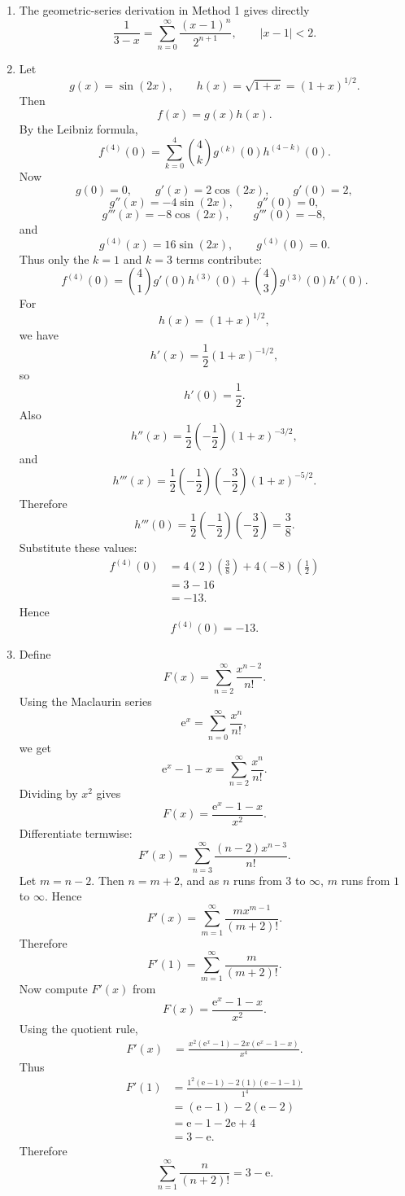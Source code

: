 \documentclass[12pt]{article}
\newcommand{\ee}{\mathrm{e}}
\begin{document}
\begin{enumerate}[label=(\alph*)]
\item The geometric-series derivation in Method 1 gives directly
\[
\boxed{\frac1{3-x}=\sum_{n=0}^{\infty}\frac{(x-1)^n}{2^{n+1}},
\qquad |x-1|<2.}
\]

\item Let
\[
g(x)=\sin(2x),
\qquad
h(x)=\sqrt{1+x}=(1+x)^{1/2}.
\]
Then
\[
f(x)=g(x)h(x).
\]
By the Leibniz formula,
\[
f^{(4)}(0)
=
\sum_{k=0}^{4}\binom{4}{k}g^{(k)}(0)h^{(4-k)}(0).
\]
Now
\[
g(0)=0,\qquad g'(x)=2\cos(2x),\qquad g'(0)=2,
\]
\[
g''(x)=-4\sin(2x),\qquad g''(0)=0,
\]
\[
g'''(x)=-8\cos(2x),\qquad g'''(0)=-8,
\]
and
\[
g^{(4)}(x)=16\sin(2x),\qquad g^{(4)}(0)=0.
\]
Thus only the $k=1$ and $k=3$ terms contribute:
\[
f^{(4)}(0)
=
\binom41g'(0)h^{(3)}(0)
+
\binom43g^{(3)}(0)h'(0).
\]
For
\[
h(x)=(1+x)^{1/2},
\]
we have
\[
h'(x)=\frac12(1+x)^{-1/2},
\]
so
\[
h'(0)=\frac12.
\]
Also
\[
h''(x)=\frac12\left(-\frac12\right)(1+x)^{-3/2},
\]
and
\[
h'''(x)=\frac12\left(-\frac12\right)\left(-\frac32\right)(1+x)^{-5/2}.
\]
Therefore
\[
h'''(0)=\frac12\left(-\frac12\right)\left(-\frac32\right)=\frac38.
\]
Substitute these values:
\begin{align*}
f^{(4)}(0)
&=
4(2)\left(\frac38\right)
+
4(-8)\left(\frac12\right)\\
&=3-16\\
&=-13.
\end{align*}
Hence
\[
\boxed{f^{(4)}(0)=-13.}
\]

\item Define
\[
F(x)=\sum_{n=2}^{\infty}\frac{x^{n-2}}{n!}.
\]
Using the Maclaurin series
\[
\ee^x=\sum_{n=0}^{\infty}\frac{x^n}{n!},
\]
we get
\[
\ee^x-1-x=\sum_{n=2}^{\infty}\frac{x^n}{n!}.
\]
Dividing by $x^2$ gives
\[
F(x)=\frac{\ee^x-1-x}{x^2}.
\]
Differentiate termwise:
\[
F'(x)
=
\sum_{n=3}^{\infty}\frac{(n-2)x^{n-3}}{n!}.
\]
Let $m=n-2$. Then $n=m+2$, and as $n$ runs from $3$ to $\infty$, $m$ runs from $1$ to $\infty$. Hence
\[
F'(x)
=
\sum_{m=1}^{\infty}\frac{m x^{m-1}}{(m+2)!}.
\]
Therefore
\[
F'(1)=\sum_{m=1}^{\infty}\frac{m}{(m+2)!}.
\]
Now compute $F'(x)$ from
\[
F(x)=\frac{\ee^x-1-x}{x^2}.
\]
Using the quotient rule,
\begin{align*}
F'(x)
&=
\frac{x^2(\ee^x-1)-2x(\ee^x-1-x)}{x^4}.
\end{align*}
Thus
\begin{align*}
F'(1)
&=
\frac{1^2(\ee-1)-2(1)(\ee-1-1)}{1^4}\\
&=
(\ee-1)-2(\ee-2)\\
&=
\ee-1-2\ee+4\\
&=
3-\ee.
\end{align*}
Therefore
\[
\boxed{\sum_{n=1}^{\infty}\frac{n}{(n+2)!}=3-\ee.}
\]
\end{enumerate}
\end{document}
